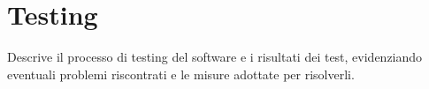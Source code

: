 \chapter{Testing} \label{chap:Testing}
Descrive il processo di testing del software e i risultati dei test, evidenziando eventuali problemi riscontrati e le misure adottate per risolverli.